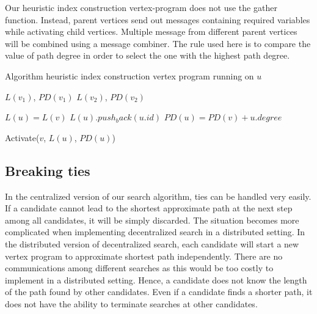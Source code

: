 Our heuristic index construction vertex-program does not use the gather function. Instead, parent vertices send out messages containing required variables while activating child vertices. Multiple message from different parent vertices will be combined using a message combiner. The rule used here is to compare the value of path degree in order to select the one with the highest path degree.

\begin{algorithm}
    \caption{Algorithm heuristic index construction vertex program running on $u$}
		\label{alg:vc_bfs}
    \begin{algorithmic}
						\State \Return $L(v_1)$, $PD(v_1)$
				\Else
						\State \Return $L(v_2)$, $PD(v_2)$
				\EndIf
        \EndFunction

        \State $L(u) = L(v)$
				\State $L(u).push_back(u.id)$
        \State $PD(u) = PD(v) + u.degree$
        \EndFunction

            \State Activate($v$, $L(u)$, $PD(u)$)
        \EndIf
        \EndFunction
    \end{algorithmic}
\end{algorithm}

\subsection{Breaking ties}

In the centralized version of our search algorithm, ties can be handled very easily. If a candidate cannot lead to the shortest approximate path at the next step among all candidates, it will be simply discarded. The situation becomes more complicated when implementing decentralized search in a distributed setting. In the distributed version of decentralized search, each candidate will start a new vertex program to approximate shortest path independently. There are no communications among different searches as this would be too costly to implement in a distributed setting. Hence, a candidate does not know the length of the path found by other candidates. Even if a candidate finds a shorter path, it does not have the ability to terminate searches at other candidates.

